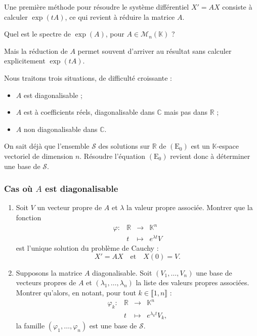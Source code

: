 \documentclass[french]{article}
\newcommand{\R}{\mathbb{R}}
\newcommand{\C}{\mathbb{C}}
\newcommand{\K}{\mathbb{K}}
\theoremstyle{plain}
\theoremstyle{definition}
\theoremstyle{remark}
\begin{document}
Une première méthode pour résoudre le système différentiel $X'=AX$ consiste à calculer $\exp(tA)$, ce qui revient à réduire la matrice $A$.

\begin{exo}
	Quel est le spectre de $\exp(A)$, pour $A\in\mathcal{M}_n(\K)$ ?
\end{exo}

Mais la réduction de $A$ permet souvent d'arriver au résultat sans calculer explicitement $\exp(tA)$.

Nous traitons trois situations, de difficulté croissante :
\begin{itemize}
	\item $A$ est diagonalisable ;
	\item $A$ est à coefficients réels, diagonalisable dans $\C$ mais pas dans $\R$ ;
	\item $A$ non diagonalisable dans $\C$.
\end{itemize}

On sait déjà que l'ensemble $\mathcal{S}$ des solutions sur $\R$ de $(\text{E}_0)$ est un $\K$-espace vectoriel de dimension $n$. Résoudre l'équation $(\text{E}_0)$ revient donc à déterminer une base de $\mathcal{S}$.

\subsubsection*{Cas où $A$ est diagonalisable}

\begin{exo}
	\begin{enumerate}
		\item Soit $V$ un vecteur propre de $A$ et $\lambda$ la valeur propre associée. Montrer que la fonction $$\begin{array}{lrcl}
			\varphi:&\R&\longrightarrow&\K^n\\
			&t&\longmapsto&e^{\lambda t}V
		\end{array}$$ est l'unique solution du problème de Cauchy :
		$$X'=AX\quad\text{et}\quad X(0)=V.$$
		\item Supposons la matrice $A$ diagonalisable. Soit $(V_1,\ldots,V_n)$ une base de vecteurs propres de $A$ et $(\lambda_1,\ldots,\lambda_n)$ la liste des valeurs propres associées.\\
		Montrer qu'alors, en notant, pour tout $k\in\llbracket1,n\rrbracket$ :
		$$\begin{array}{lrcl}
			\varphi_k:&\R&\longrightarrow&\K^n\\
			&t&\longmapsto&e^{\lambda_k t}V_k,
		\end{array}$$ la famille $(\varphi_1,\ldots,\varphi_n)$ est une base de $\mathcal{S}$.
	\end{enumerate}
\end{exo}
\end{document}
